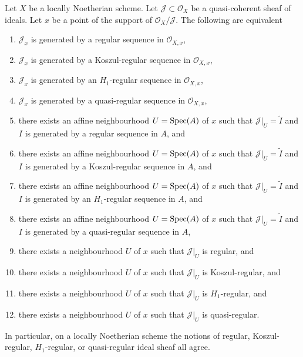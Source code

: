 \begin{lemma}
\label{lemma-Noetherian-scheme-regular-ideal}
Let $X$ be a locally Noetherian scheme. Let $\mathcal{J} \subset \mathcal{O}_X$
be a quasi-coherent sheaf of ideals. Let $x$ be a point of the support of
$\mathcal{O}_X/\mathcal{J}$. The following are equivalent
\begin{enumerate}
\item $\mathcal{J}_x$ is generated by a regular sequence in
$\mathcal{O}_{X, x}$,
\item $\mathcal{J}_x$ is generated by a Koszul-regular sequence in
$\mathcal{O}_{X, x}$,
\item $\mathcal{J}_x$ is generated by an $H_1$-regular sequence in
$\mathcal{O}_{X, x}$,
\item $\mathcal{J}_x$ is generated by a quasi-regular sequence in
$\mathcal{O}_{X, x}$,
\item there exists an affine neighbourhood $U = \mathop{\mathrm{Spec}}(A)$ of $x$ such
that $\mathcal{J}|_U = \widetilde{I}$ and $I$ is generated by a
regular sequence in $A$, and
\item there exists an affine neighbourhood $U = \mathop{\mathrm{Spec}}(A)$ of $x$ such
that $\mathcal{J}|_U = \widetilde{I}$ and $I$ is generated by a
Koszul-regular sequence in $A$, and
\item there exists an affine neighbourhood $U = \mathop{\mathrm{Spec}}(A)$ of $x$ such
that $\mathcal{J}|_U = \widetilde{I}$ and $I$ is generated by an
$H_1$-regular sequence in $A$, and
\item there exists an affine neighbourhood $U = \mathop{\mathrm{Spec}}(A)$ of $x$ such
that $\mathcal{J}|_U = \widetilde{I}$ and $I$ is generated by a
quasi-regular sequence in $A$,
\item there exists a neighbourhood $U$ of $x$ such that $\mathcal{J}|_U$
is regular, and
\item there exists a neighbourhood $U$ of $x$ such that $\mathcal{J}|_U$
is Koszul-regular, and
\item there exists a neighbourhood $U$ of $x$ such that $\mathcal{J}|_U$
is $H_1$-regular, and
\item there exists a neighbourhood $U$ of $x$ such that $\mathcal{J}|_U$
is quasi-regular.
\end{enumerate}
In particular, on a locally Noetherian scheme the notions of
regular, Koszul-regular, $H_1$-regular, or quasi-regular ideal sheaf all agree.
\end{lemma}

